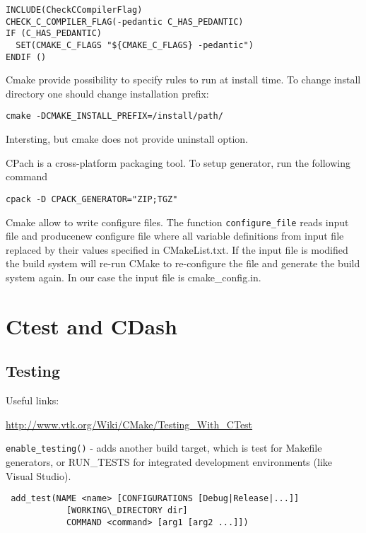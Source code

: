 \documentclass[a4paper,10pt]{article}
\begin{document}
\begin{verbatim}
INCLUDE(CheckCCompilerFlag)
CHECK_C_COMPILER_FLAG(-pedantic C_HAS_PEDANTIC)
IF (C_HAS_PEDANTIC)
  SET(CMAKE_C_FLAGS "${CMAKE_C_FLAGS} -pedantic")
ENDIF ()
\end{verbatim}


Cmake provide possibility to specify rules to run at install time. 
To change install directory one should change installation prefix:
\begin{verbatim}
cmake -DCMAKE_INSTALL_PREFIX=/install/path/
\end{verbatim}

Intersting, but cmake does not provide uninstall option. 



CPach is a cross-platform packaging tool. To setup generator, run the following command
\begin{verbatim}
cpack -D CPACK_GENERATOR="ZIP;TGZ" 
\end{verbatim}



Cmake allow to write configure files. The function \texttt{configure\_file} reads input file and producenew configure file where all variable definitions from input file replaced by their values specified in CMakeList.txt.
If the input file is modified the build system will re-run CMake to re-configure the file and generate the build system again. In our case the input file is cmake\_config.in.




\section{Ctest and CDash}
\subsection{Testing}

Useful links:

\url{http://www.vtk.org/Wiki/CMake/Testing_With_CTest}


\texttt{enable\_testing()} -  adds another build target, which is test for Makefile generators, or RUN\_TESTS for integrated development environments (like Visual Studio).


\begin{verbatim}
 add_test(NAME <name> [CONFIGURATIONS [Debug|Release|...]]
            [WORKING\_DIRECTORY dir]
            COMMAND <command> [arg1 [arg2 ...]])
\end{verbatim}
\end{document}
